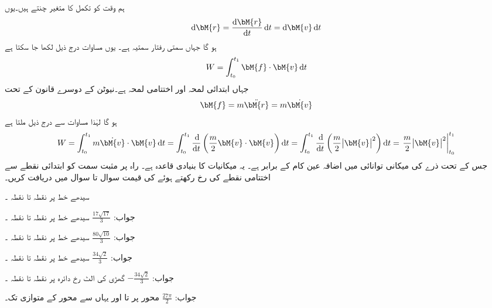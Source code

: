 ہم وقت  کو تکمل کا متغیر چنتے ہیں۔یوں
\begin{align*}
\dif \bM{r}=\frac{\dif\bM{r}}{\dif t}\dif t=\dif \bM{v}\dif t
\end{align*} 
ہو گا جہاں  سمتی رفتار سمتیہ ہے۔ یوں مساوات  درج ذیل لکھا جا سکتا ہے
\begin{align}\label{مساوات_خطی_تکمل_کام_ب}
W=\int_{t_0}^{t_1}\bM{f}\cdot \bM{v}\dif t
\end{align}
جہاں ابتدائی لمحہ  اور اختتامی لمحہ  ہے۔نیوٹن کے دوسرے قانون کے تحت 
\begin{align}
\bM{f}=m\ddot{\bM{r}}=m\dot{\bM{v}}
\end{align}
ہو گا لہٰذا مساوات  سے درج ذیل ملتا ہے
\begin{align*}
W=\int_{t_0}^{t_1}m\dot{\bM{v}}\cdot \bM{v}\dif t=\int_{t_0}^{t_1}\frac{\dif}{\dif t}\left(\frac{m}{2}\bM{v}\cdot \bM{v}\right)\dif t=\int_{t_0}^{t_1}\frac{\dif}{\dif t}\left(\frac{m}{2}\abs{\bM{v}}^2\right)\dif t=\left.\frac{m}{2}\abs{\bM{v}}^2\right |_{t_0}^{t_1}
\end{align*}
جس  کے تحت ذرے کی میکانی توانائی میں اضافہ عین  کام کے برابر ہے۔ یہ میکانیات کا بنیادی قاعدہ ہے۔ 
راہ پر مثبت سمت کو ابتدائی نقطے سے اختتامی نقطے کی رخ رکھتے ہوئے  کی قیمت سوال  تا سوال  میں دریافت کریں۔

سیدھے خط  پر نقطہ  تا نقطہ ۔

جواب:\quad
$\tfrac{17\sqrt{17}}{3}$
سیدھے خط  پر نقطہ  تا نقطہ ۔

جواب:\quad
$\tfrac{80\sqrt{10}}{3}$
سیدھے خط  پر نقطہ  تا نقطہ ۔

جواب:\quad
$\tfrac{34\sqrt{2}}{3}$
سیدھے خط  پر نقطہ  تا نقطہ ۔

جواب:\quad
$-\tfrac{34\sqrt{2}}{3}$
گھڑی کی الٹ رخ دائرہ  پر نقطہ  تا نقطہ ۔

جواب:\quad
$\tfrac{27\pi}{2}$
 محور پر  تا  اور یہاں سے  محور کے متوازی  تک۔

